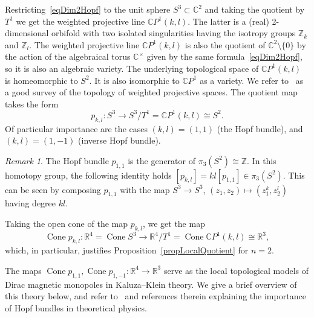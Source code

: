 \documentclass[english,12pt,oneside]{amsproc}
\DeclareMathOperator{\Cone}{Cone} \DeclareMathOperator{\pt}{pt}
\newcommand{\Zo}{\mathbb{Z}}
\newcommand{\Ro}{\mathbb{R}}
\newcommand{\Co}{\mathbb{C}}
\newcommand{\CP}{\mathbb{C}P}
\newcounter{stmcounter}[section]
\numberwithin{equation}{section}
\theoremstyle{plain}
\theoremstyle{definition}
\theoremstyle{remark}
\newtheorem{rem}[stmcounter]{Remark}
\begin{document}
Restricting~\eqref{eqDim2Hopf} to the unit sphere $S^3\subset\Co^2$ and taking the quotient by $T^1$ we get the weighted projective line $\CP^1(k,l)$. The latter is a (real) 2-dimensional orbifold with two isolated singularities having the isotropy groups $\Zo_k$ and $\Zo_l$. The weighted projective line $\CP^1(k,l)$ is also the quotient of $\Co^2\setminus\{0\}$ by the action of the algebraical torus $\Co^\times$ given by the same formula~\eqref{eqDim2Hopf}, so it is also an algebraic variety. The underlying topological space of $\CP^1(k,l)$ is homeomorphic to $S^2$. It is also isomorphic to $\CP^1$ as a variety. We refer to~\cite{BFNR} as a good survey of the topology of weighted projective spaces. The quotient map takes the form
\begin{equation}\label{eqGenHopf}
p_{k,l}\colon S^3\to S^3/T^1=\CP^1(k,l)\cong S^2.
\end{equation}
Of particular importance are the cases $(k,l)=(1,1)$ (the Hopf bundle), and $(k,l)=(1,-1)$ (inverse Hopf bundle).

\begin{rem}
The Hopf bundle $p_{1,1}$ is the generator of $\pi_3(S^2)\cong\Zo$. In this homotopy group, the following identity holds $[p_{k,l}]=kl[p_{1,1}]\in\pi_3(S^2)$. This can be seen by composing $p_{1,1}$ with the map $S^3\to S^3$, $(z_1,z_2)\mapsto (z_1^k,z_2^l)$ having degree $kl$.
\end{rem}

Taking the open cone of the map $p_{k,l}$, we get the map
\[
\Cone p_{k,l}\colon\Ro^4=\Cone S^3\to \Ro^4/T^1=\Cone\CP^1(k,l)\cong \Ro^3,
\]
which, in particular, justifies Proposition~\ref{propLocalQuotient} for $n=2$.

The maps $\Cone p_{1,1}, \Cone p_{1,-1}\colon \Ro^4\to\Ro^3$ serve as the local topological models of Dirac magnetic monopoles in Kaluza--Klein theory. We give a brief overview of this theory below, and refer to~\cite[p.5]{AtBer} and references therein explaining the importance of Hopf bundles in theoretical physics.
\end{document}
